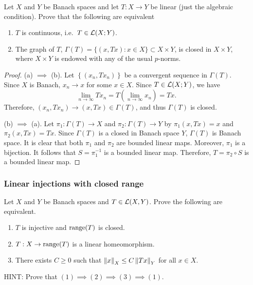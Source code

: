 \documentclass[a4paper]{article}
\begin{document}
\begin{thm}
  Let $X$ and $Y$ be Banach spaces and let $T : X \to Y$ be linear (just
  the algebraic condition). Prove that the following are equivalent
\end{thm}
\begin{enumerate}
  \item $T$ is continuous, i.e.\ $T \in \mathcal{L}(X;Y)$.
  \item The graph of $T$, $\Gamma(T) = \{(x,Tx) : x \in X\} \subset X
        \times Y$, is closed in $X \times Y$, where $X \times Y$ is
        endowed with any of the usual $p$-norms.
\end{enumerate}

\begin{proof}
  (a) $\implies$ (b). Let $\left\{ (x_n, T x_n) \right\}$ be a convergent sequence
  in $\Gamma(T)$. Since $X$ is Banach, $x_n \to x$ for some $x \in X$.
  Since $T \in \mathcal{L}(X ; Y)$, we have
  \[
    \lim_{n \to \infty} T x_n = T \left( \lim_{n \to \infty} x_n \right) = T x.
  \]
  Therefore, $(x_n, T x_n) \to (x, T x) \in \Gamma(T)$, and thus
  $\Gamma(T)$ is closed.

  (b) $\implies$ (a). Let $\pi_1 : \Gamma(T) \to X$ and
  $\pi_2 : \Gamma(T) \to Y$ by
  $\pi_1 (x, T x) = x$ and $\pi_2 (x, T x) = Tx$. Since
  $\Gamma(T)$ is a closed in Banach space $Y$,
  $\Gamma(T)$ is Banach space. It is clear that both $\pi_1$
  and $\pi_2$ are bounded linear maps. Moreover, $\pi_1$ is a
  bijection. It follows that $S = \pi_1^{-1}$ is a bounded linear
  map. Therefore, $T = \pi_2 \circ S$ is a bounded linear map.

\end{proof}

\subsubsection*{Linear injections with closed range}
\begin{thm}
  Let $X$ and $Y$ be Banach spaces and $T \in \mathcal{L}(X,Y)$. Prove the
  following are equivalent.
  \begin{enumerate}
    \item $T$ is injective and $\operatorname{range}(T)$ is closed.
    \item $T : X \to \operatorname{range}(T)$ is a linear homeomorphism.
    \item There exists $C\ge 0$ such that $\left\lVert x\right\rVert_X \leq C \left\lVert Tx\right\rVert_Y$
          for all $x \in X$.
  \end{enumerate}
  HINT: Prove that $(1) \implies (2) \implies (3) \implies
    (1)$.
\end{thm}
\end{document}
